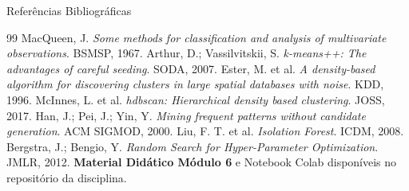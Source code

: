 \documentclass[aspectratio=169]{beamer}
\begin{document}
\begin{frame}{Referências Bibliográficas}
    \begin{thebibliography}{99}\footnotesize
         MacQueen, J. \textit{Some methods for classification and analysis of multivariate observations}. BSMSP, 1967.
         Arthur, D.; Vassilvitskii, S. \textit{k-means++: The advantages of careful seeding}. SODA, 2007.
         Ester, M. et al. \textit{A density-based algorithm for discovering clusters in large spatial databases with noise}. KDD, 1996.
         McInnes, L. et al. \textit{hdbscan: Hierarchical density based clustering}. JOSS, 2017.
         Han, J.; Pei, J.; Yin, Y. \textit{Mining frequent patterns without candidate generation}. ACM SIGMOD, 2000.
         Liu, F. T. et al. \textit{Isolation Forest}. ICDM, 2008.
         Bergstra, J.; Bengio, Y. \textit{Random Search for Hyper-Parameter Optimization}. JMLR, 2012.
         \textbf{Material Didático Módulo 6} e Notebook Colab disponíveis no repositório da disciplina.
    \end{thebibliography}
\end{frame}
\end{document}
